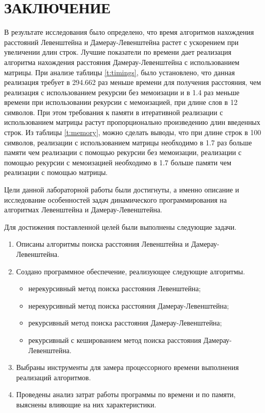 \chapter*{\hfill{\centering  ЗАКЛЮЧЕНИЕ}\hfill}

В результате исследования было определено, что время алгоритмов нахождения расстояний Левенштейна и Дамерау-Левенштейна растет с ускорением при увеличении длин строк.
Лучшие показатели по времени дает реализация алгоритма нахождения расстояния Дамерау-Левенштейна с использованием матрицы.
При анализе таблицы  \ref{t:timings}, было установлено, что данная реализация требует в 294.662 раз меньше времени для получения расстояния, чем реализация с использованием рекурсии без мемоизации и в 1.4 раз меньше времени при использовании рекурсии с мемоизацией, при длине слов в 12 символов.
При этом требования к памяти в итеративной реализации с использованием матрицы растут пропорционально произведению длин введенных строк. Из таблицы \ref{t:memory}, можно сделать выводы, что при длине строк в 100 символов, реализации с использованием матрицы 
необходимо в 1.7 раз больше памяти чем реализации с помощью рекурсии без мемоизации, реализации с помощью рекурсии с мемоизацией необходимо в 1.7 больше памяти чем реализации с помощью матрицы.


Цели данной лабораторной работы были достигнуты, а именно описание и исследование особенностей задач динамического программирования на алгоритмах Левенштейна и Дамерау-Левенштейна.

Для достижения поставленной целей были выполнены следующие задачи.
\begin{enumerate}[label={\arabic*)}]
	\item Описаны алгоритмы поиска расстояния Левенштейна и \newline Дамерау-Левенштейна.
	\item Создано программное обеспечение, реализующее следующие алгоритмы.
	\begin{itemize}[label=---]
		\item нерекурсивный метод поиска расстояния Левенштейна;
		\item нерекурсивный метод поиска расстояния Дамерау-Левенштейна;
		\item рекурсивный метод поиска расстояния Дамерау-Левенштейна;
		\item рекурсивный с кешированием метод поиска расстояния Дамерау-Левенштейна.
	\end{itemize}
	\item Выбраны инструменты для замера процессорного времени выполнения реализаций алгоритмов.
	\item Проведены анализ затрат работы программы по времени и по памяти, выяснены влияющие на них характеристики. 
\end{enumerate}
